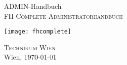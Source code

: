 %
%

\begin{titlepage}
\begin{center}
\vspace*{40mm} \huge ADMIN-Handbuch\\
\vspace*{10mm}
\large \textsc{FH-Complete Administratorhandbuch}

\vfill \texttt{[image: fhcomplete]}
	
\vfill \textsc{Technikum Wien}\\

Wien, \today
\end{center}
\end{titlepage}
